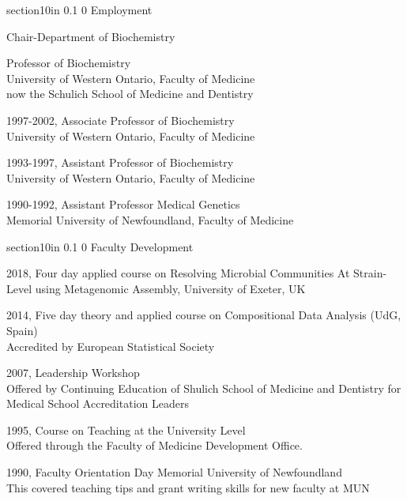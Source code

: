 \documentclass[11pt]{article}
\makeatletter
\renewcommand\section{\@startsection
	{section}{1}{0in}%
	{0.1\baselineskip}%
	{0\baselineskip}%
	{\sffamily\bfseries\large}
}
\makeatother
\begin{document}
\section{Employment}\itemsep=2pt
\begin{description}\itemsep=2pt
\item[2019-present,]  Chair-Department of Biochemistry
\item[2002-present,] Professor of Biochemistry\\ University of Western Ontario, Faculty of Medicine\\ now the Schulich School of Medicine and Dentistry
\item 1997-2002, Associate Professor of Biochemistry\\ University of Western Ontario, Faculty of Medicine
\item 1993-1997,	Assistant Professor of Biochemistry\\ University of Western Ontario, Faculty of Medicine
\item 1990-1992,	Assistant Professor Medical Genetics\\ Memorial University of Newfoundland, Faculty of Medicine
\end{description}
\section{Faculty Development}
\begin{description}
\item 2018, Four day applied course on Resolving Microbial Communities At Strain-Level using Metagenomic Assembly, University of Exeter, UK
\item 2014, Five day theory and applied course on Compositional Data Analysis (UdG, Spain)\\ Accredited by European Statistical Society

\item 2007, Leadership Workshop\\ Offered by Continuing Education of Shulich School of Medicine and Dentistry for Medical School Accreditation Leaders
\item 1995,  Course on Teaching at the University 	Level\\ Offered through the Faculty of Medicine Development Office.
\item 1990, Faculty Orientation Day Memorial University of Newfoundland\\
		This covered teaching tips and grant writing skills for 	new faculty at MUN

\end{description}
\end{document}
